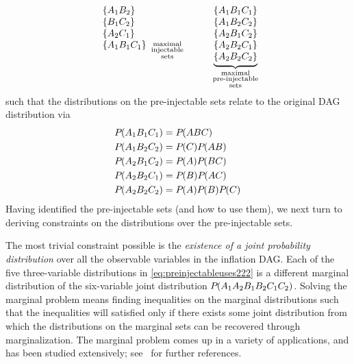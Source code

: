 \begin{align}
{{\begin{array}{l}
\left\lbrace A_1 B_2\right\rbrace\\
\left\lbrace B_1 C_2\right\rbrace\\
\left\lbrace A_2 C_1\right\rbrace\\
\left\lbrace A_1 B_1 C_1\right\rbrace
\end{array}}_{\substack{\text{maximal}\\\text{injectable}\\\text{sets}}}}
\qquad\quad
{\underbrace{\begin{matrix}
\\
\left\lbrace A_1 B_1 C_1\right\rbrace \\
\left\lbrace A_1 B_2 C_2\right\rbrace \\
\left\lbrace A_2 B_1 C_2\right\rbrace \\
\left\lbrace A_2 B_2 C_1\right\rbrace \\
\left\lbrace A_2 B_2 C_2\right\rbrace
\end{matrix}}_{\substack{\text{maximal}\\\text{pre-injectable}\\\text{sets}}}}
\end{align}
such that the distributions on the pre-injectable sets relate to the original DAG distribution via
\begin{align}\label{eq:preinjectableuses222}
\begin{split}
&{P_{}}\lparen A_1 B_1 C_1\rparen = {P_{}}\lparen A B C\rparen \\
&{P_{}}\lparen A_1 B_2 C_2\rparen = {P_{}}\lparen C\rparen{P_{}}\lparen A B\rparen\\
&{P_{}}\lparen A_2 B_1 C_2\rparen = {P_{}}\lparen A\rparen{P_{}}\lparen B C\rparen\\
&{P_{}}\lparen A_2 B_2 C_1\rparen = {P_{}}\lparen B\rparen{P_{}}\lparen A C\rparen\\
&{P_{}}\lparen A_2 B_2 C_2\rparen = {P_{}}\lparen A\rparen{P_{}}\lparen B\rparen{P_{}}\lparen C\rparen
\end{split}
\end{align}
Having identified the pre-injectable sets (and how to use them), we next turn to deriving constraints on the distributions over the pre-injectable sets.


\label{step:marginalsproblem}\par\smallskip\nobreak

The most trivial constraint possible 
is the \emph{existence of a joint probability distribution} over all the observable variables in the inflation DAG. Each of the five three-variable distributions in \cref{eq:preinjectableuses222} is a different marginal distribution of the six-variable joint distribution ${P_{}}\lparen A_1 A_2 B_1 B_2 C_1 C_2\rparen$. Solving the marginal problem means finding inequalities on the marginal distributions such that the inequalities will satisfied only if there exists some joint distribution from which the distributions on the marginal sets can be recovered through marginalization. The marginal problem comes up in a variety of applications, and has been studied extensively; see~\cite{fritz2013marginal} for further references.  

